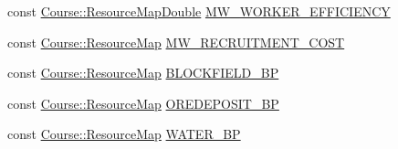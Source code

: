 \begin{DoxyCompactItemize}
const \hyperlink{namespaceCourse_a0b96bae1a664dde34efbb1b42dea615e}{Course\-::\-Resource\-Map\-Double} \hyperlink{namespaceGame_1_1ConstResourceMaps_a11fc543cda6cf6dbd703559e230eb49a}{M\-W\-\_\-\-W\-O\-R\-K\-E\-R\-\_\-\-E\-F\-F\-I\-C\-I\-E\-N\-C\-Y}
\item 
const \hyperlink{namespaceCourse_ab9a46ed9cd00485e318e5731ea2f78d9}{Course\-::\-Resource\-Map} \hyperlink{namespaceGame_1_1ConstResourceMaps_ad5d316811f8c8442f6c24b5dc9134a87}{M\-W\-\_\-\-R\-E\-C\-R\-U\-I\-T\-M\-E\-N\-T\-\_\-\-C\-O\-S\-T}
\item 
const \hyperlink{namespaceCourse_ab9a46ed9cd00485e318e5731ea2f78d9}{Course\-::\-Resource\-Map} \hyperlink{namespaceGame_1_1ConstResourceMaps_aca102e5c0cc70c09b1934a785bca2b91}{B\-L\-O\-C\-K\-F\-I\-E\-L\-D\-\_\-\-B\-P}
\item 
const \hyperlink{namespaceCourse_ab9a46ed9cd00485e318e5731ea2f78d9}{Course\-::\-Resource\-Map} \hyperlink{namespaceGame_1_1ConstResourceMaps_a7b803a949c1a3e044a6a6f985928a0cc}{O\-R\-E\-D\-E\-P\-O\-S\-I\-T\-\_\-\-B\-P}
\item 
const \hyperlink{namespaceCourse_ab9a46ed9cd00485e318e5731ea2f78d9}{Course\-::\-Resource\-Map} \hyperlink{namespaceGame_1_1ConstResourceMaps_a0a964a6f0f80340d5a2d5a0a8dd0f79a}{W\-A\-T\-E\-R\-\_\-\-B\-P}
\end{DoxyCompactItemize}


